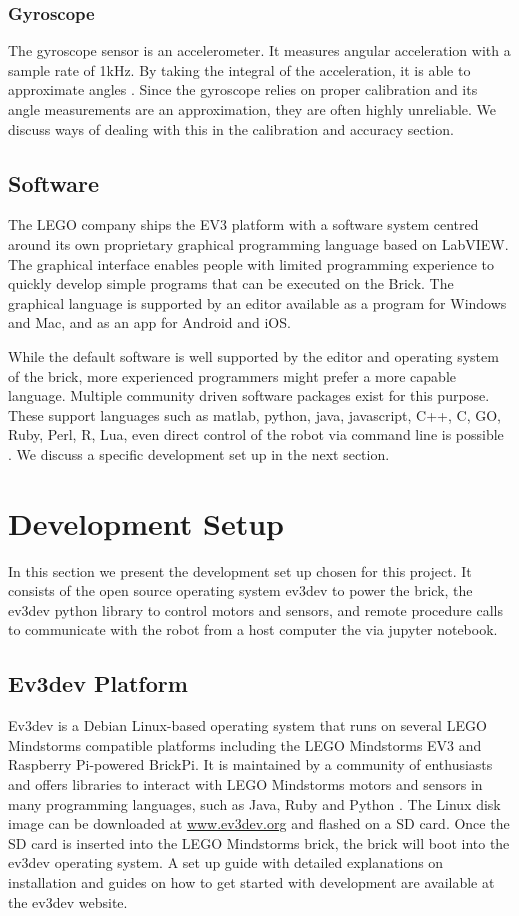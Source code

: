\documentclass[11pt, a4paper]{article}
\begin{document}
\subsubsection*{Gyroscope}
The gyroscope sensor is an accelerometer. It measures angular acceleration with a sample rate of 1kHz. By taking the integral of the acceleration, it is able to approximate angles \cite{gyroscope}. Since the gyroscope relies on proper calibration and its angle measurements are  an approximation, they are often highly unreliable. We discuss ways of dealing with this in the calibration and accuracy section.


\subsection{Software}
The LEGO company ships the EV3 platform with a software system centred around its own proprietary graphical programming language based on LabVIEW. The graphical interface enables people with limited programming experience to quickly develop simple programs that can be executed on the Brick. The graphical language is supported by an editor available as a program for Windows and Mac, and as an app for Android and iOS.

While the default software is well supported by the editor and operating system of the brick, more experienced programmers might prefer a more capable language. Multiple community driven software packages exist for this purpose. These support languages such as matlab, python, java, javascript, C++, C, GO, Ruby, Perl, R, Lua, even direct control of the robot via command line is possible \cite{ev3dev}. We discuss a specific development set up in the next section.



\section{Development Setup}
In this section we present the development set up chosen for this project. It consists of the open source operating system ev3dev to power the brick, the ev3dev python library to control motors and sensors, and remote procedure calls to communicate with the robot from a host computer the via jupyter notebook.

\subsection{Ev3dev Platform}
Ev3dev is a Debian Linux-based operating system that runs on several LEGO Mindstorms compatible platforms including the LEGO Mindstorms EV3 and Raspberry Pi-powered BrickPi. It is maintained by a community of enthusiasts and offers libraries to interact with LEGO Mindstorms motors and sensors in many programming languages, such as Java, Ruby and Python \cite{ev3dev}. The Linux disk image can be downloaded at \href{https://www.ev3dev.org/}{www.ev3dev.org} and flashed on a SD card. Once the SD card is inserted into the LEGO Mindstorms brick, the brick will boot into the ev3dev operating system. A set up guide with detailed explanations on installation and guides on how to get started with development are available at the ev3dev website.
\end{document}
